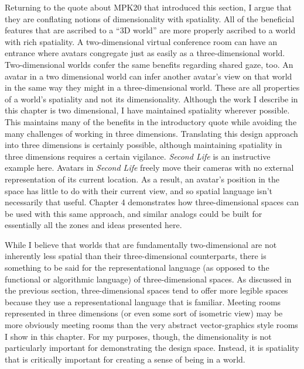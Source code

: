Returning to the quote about MPK20 that introduced this section, I argue that they are conflating notions of dimensionality with spatiality. All of the beneficial features that are ascribed to a ``3D world'' are more properly ascribed to a world with rich spatiality. A two-dimensional virtual conference room can have an entrance where avatars congregate just as easily as a three-dimensional world. Two-dimensional worlds confer the same benefits regarding shared gaze, too. An avatar in a two dimensional world can infer another avatar's view on that world in the same way they might in a three-dimensional world. These are all properties of a world's spatiality and not its dimensionality. Although the work I describe in this chapter is two dimensional, I have maintained spatiality wherever possible. This maintains many of the benefits in the introductory quote while avoiding the many challenges of working in three dimensions. Translating this design approach into three dimensions is certainly possible, although maintaining spatiality in three dimensions requires a certain vigilance. \emph{Second Life} is an instructive example here. Avatars in \emph{Second Life} freely move their cameras with no external representation of its current location. As a result, an avatar's position in the space has little to do with their current view, and so spatial language isn't necessarily that useful.  Chapter 4 demonstrates how three-dimensional spaces can be used with this same approach, and similar analogs could be built for essentially all the zones and ideas presented here.

While I believe that worlds that are fundamentally two-dimensional are not inherently less spatial than their three-dimensional counterparts, there is something to be said for the representational language (as opposed to the functional or algorithmic language) of three-dimensional spaces. As discussed in the previous section, three-dimensional spaces tend to offer more legible spaces because they use a representational language that is familiar. Meeting rooms represented in three dimensions (or even some sort of isometric view) may be more obviously meeting rooms than the very abstract vector-graphics style rooms I show in this chapter. For my purposes, though, the dimensionality is not particularly important for demonstrating the design space. Instead, it is spatiality that is critically important for creating a sense of being in a world.


